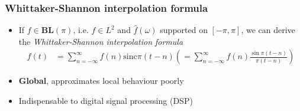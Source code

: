 \documentclass{beamer}
\begin{document}
\begin{frame}
\frametitle{Whittaker-Shannon interpolation formula}
\begin{itemize}
	\item If $f \in \mathbf{BL}(\pi)$, i.e. $f \in L^2$ and $\hat{f}(\omega)$ 
		supported on $[-\pi, \pi]$, we can derive the \textit{Whittaker-Shannon
		interpolation formula}
		\begin{align}
		f(t)	&= \sum_{n=-\infty}^{\infty} f(n) \mathrm{sinc}{\pi(t-n)} \left (
				= \sum_{n=-\infty}^{\infty} f(n) \frac{\sin{\pi(t-n)}}{\pi(t-n)}
				\right )
		\end{align}
	\item \textbf{Global}, approximates local behaviour poorly
	\item Indispensable to digital signal processing (DSP)
\end{itemize}
\end{frame}

\end{document}
